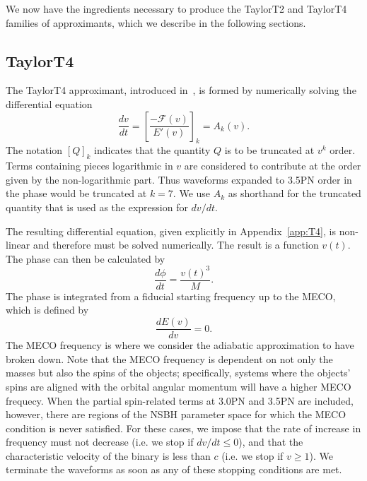We now have the ingredients necessary to produce the TaylorT2 and TaylorT4
families of approximants, which we describe in the following sections. 

\subsection{TaylorT4}

The TaylorT4 approximant, introduced in~\cite{Buonanno:2002fy}, is formed by
numerically solving the differential equation
%
\begin{equation}\label{eq:t4}
%
\frac{dv}{dt} = \left[ \frac{-\mathcal{F}(v)}{E'(v)} \right]_{k} = A_{k}(v).
%
\end{equation}
%
The notation $\left[ Q \right]_{k}$ indicates that the quantity $Q$ is to be
truncated at $v^k$ order. Terms containing pieces logarithmic in
$v$ are considered to contribute at the order given by the non-logarithmic
part. Thus waveforms expanded to 3.5\ac{PN} order in the phase would be
truncated at $k = 7$.  We use $A_k$ as shorthand for the truncated quantity that
is used as the expression for $dv/dt$.

The resulting differential equation, given explicitly in Appendix~\ref{app:T4},
is non-linear and therefore must be solved numerically. The result is a
function $v(t)$. The phase can then be calculated by
%
\begin{equation}
%
\frac{d\phi}{dt} = \frac{v(t)^3}{M}.
%
\end{equation}
%
The phase is integrated from a fiducial starting frequency up to the \ac{MECO},
which is defined by
%
\begin{equation}
%
\frac{dE(v)}{dv} = 0.
%
\end{equation}
%
The \ac{MECO} frequency is where we consider the adiabatic approximation to have broken down. Note
that the \ac{MECO} frequency is dependent on not only the masses but also the
spins of the objects; specifically, systems where the objects' spins are aligned
with the orbital angular momentum will have a higher \ac{MECO} frequecy.
When the partial spin-related terms at 3.0\ac{PN} and 3.5\ac{PN} are included, however,
there are regions of the \ac{NSBH} parameter space for which the MECO condition is never satisfied. For these cases,
we impose that the rate of increase in frequency must not decrease (i.e. we stop if $dv/dt \leq 0$), and that the 
characteristic velocity of the binary is less than $c$ (i.e. we stop if $v \geq 1$). 
We terminate the waveforms as soon as any of these stopping conditions are met.

